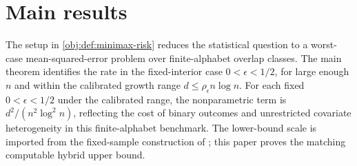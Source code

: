 \section{Main results}

The setup in \cref{obj:def:minimax-risk} reduces the statistical question to a worst-case mean-squared-error problem over finite-alphabet overlap classes. The main theorem identifies the rate in the fixed-interior case \(0<\epsilon<1/2\), for large enough \(n\) and within the calibrated growth range \(d\le \rho_\epsilon n\log n\). For each fixed \(0<\epsilon<1/2\) under the calibrated range, the nonparametric term is \(d^2/(n^2\log^2 n)\), reflecting the cost of binary outcomes and unrestricted covariate heterogeneity in this finite-alphabet benchmark. The lower-bound scale is imported from the fixed-sample construction of \citet{ZengBalakrishnanHanKennedy2024}; this paper proves the matching computable hybrid upper bound.

